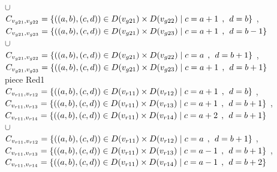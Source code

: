 \\$\cup$
\\$C_{v_{g21},v_{g22}}=\{((a,b),(c,d))\in D(v_{g21}) \times D(v_{g22})\mid c = a + 1\hspace{1ex} , \hspace{1ex}  d = b   \}$ , 
\\$C_{v_{g21},v_{g23}}=\{((a,b),(c,d))\in D(v_{g21}) \times D(v_{g23})\mid c = a + 1\hspace{1ex} , \hspace{1ex}  d = b - 1 \}$  
\\$\cup$
\\$C_{v_{g21},v_{g22}}=\{((a,b),(c,d))\in D(v_{g21}) \times D(v_{g22})\mid c = a   \hspace{1ex} , \hspace{1ex}  d = b + 1 \}$ , 
\\$C_{v_{g21},v_{g23}}=\{((a,b),(c,d))\in D(v_{g21}) \times D(v_{g23})\mid c = a + 1\hspace{1ex} , \hspace{1ex}  d = b + 1 \}$  
\\ piece Red1 
\\$C_{v_{r11},v_{r12}}=\{((a,b),(c,d))\in D(v_{r11}) \times D(v_{r12})\mid c = a + 1\hspace{1ex} , \hspace{1ex}  d = b    \}$ , 
\\$C_{v_{r11},v_{r13}}=\{((a,b),(c,d))\in D(v_{r11}) \times D(v_{r13})\mid c = a + 1\hspace{1ex} , \hspace{1ex}  d = b + 1 \}$ , 
\\$C_{v_{r11},v_{r14}}=\{((a,b),(c,d))\in D(v_{r11}) \times D(v_{r14})\mid c = a + 2\hspace{1ex} , \hspace{1ex}  d = b + 1 \}$  
\\$\cup$
\\$C_{v_{r11},v_{r12}}=\{((a,b),(c,d))\in D(v_{r11}) \times D(v_{r12})\mid c = a  \hspace{1ex} , \hspace{1ex}  d = b + 1 \}$ , 
\\$C_{v_{r11},v_{r13}}=\{((a,b),(c,d))\in D(v_{r11}) \times D(v_{r13})\mid c = a - 1\hspace{1ex} , \hspace{1ex}  d = b + 1 \}$ , 
\\$C_{v_{r11},v_{r14}}=\{((a,b),(c,d))\in D(v_{r11}) \times D(v_{r14})\mid c = a - 1\hspace{1ex} , \hspace{1ex}  d = b + 2 \}$  
